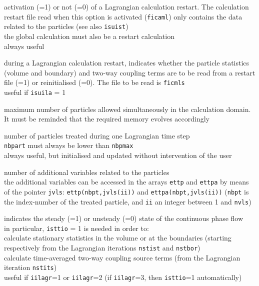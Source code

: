 {activation (=1) or not (=0) of a Lagrangian calculation restart.
The calculation restart file read when this option is activated (\texttt{ficaml})
only contains the data related to the particles (see also \texttt{isuist})\\
the global calculation must also be a restart calculation\\
always useful}

{during a Lagrangian calculation restart, indicates whether the particle
statistics (volume and boundary) and two-way coupling terms are to be read from
a restart file (=1) or reinitialised (=0). The file to be read is
\texttt{ficmls}\\
useful if \texttt{isuila} = 1}

{maximum number of particles allowed simultaneously in the calculation
domain. It must be reminded that the required memory evolves accordingly}

{number of particles treated during one Lagrangian time step\\
\texttt{nbpart} must always be lower than \texttt{nbpmax}\\
always useful, but initialised and updated without intervention of the user}

{number of additional variables related to the particles\\
the additional variables can be accessed in the arrays
\texttt{ettp} and \texttt{ettpa} by means of the
pointer \texttt{jvls}: \texttt{ettp(nbpt,jvls(ii))} and
\texttt{ettpa(nbpt,jvls(ii))} (\texttt{nbpt} is
the index-number of the treated particle, and \texttt{ii} an integer
between 1 and \texttt{nvls})}

{indicates the steady (=1) or unsteady (=0) state of the
continuous phase flow\\
in particular, \texttt{isttio} = 1 is needed in order to: \\
\hspace*{1cm}calculate stationary statistics in the volume or at the boundaries
(starting respectively from the Lagrangian iterations \texttt{nstist} and
\texttt{nstbor}) \\
\hspace*{1cm}calculate time-averaged two-way coupling source terms (from the
Lagrangian iteration \texttt{nstits}) \\
useful if \texttt{iilagr}=1 or \texttt{iilagr}=2 (if \texttt{iilagr}=3,
then \texttt{isttio}=1 automatically)}

